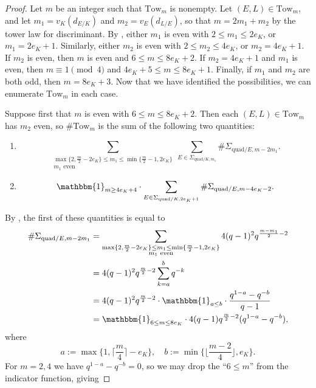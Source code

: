 \documentclass[11pt]{amsart}
\theoremstyle{theorem}
\theoremstyle{example}
\theoremstyle{definition}
\numberwithin{theorem}{section}
\numberwithin{theorem}{section}
\newcommand{\quadr}{\mathrm{quad}}
\newcommand{\Tow}{\mathrm{Tow}}
\begin{document}
\begin{proof}
    Let $m$ be an integer such that $\Tow_m$ is nonempty. Let $(E,L) \in \Tow_m$, and let $m_1 = v_K(d_{E/K})$ and $m_2 = v_E(d_{L/E})$, so that $m = 2m_1 + m_2$ by the tower law for discriminant. By \cite[Lemma~4.3]{tunnell}, either $m_1$ is even with $2 \leq m_1 \leq 2e_K$, or $m_1 = 2e_K + 1$. Similarly, either $m_2$ is even with $2 \leq m_2 \leq 4e_K$, or $m_2 = 4e_K + 1$. If $m_2$ is even, then $m$ is even and $6 \leq m \leq 8e_K + 2$. If $m_2 = 4e_K + 1$ and $m_1$ is even, then $m \equiv 1\pmod{4}$ and $4e_K + 5 \leq m \leq 8e_K + 1$. Finally, if $m_1$ and $m_2$ are both odd, then $m = 8e_K + 3$. Now that we have identified the possibilities, we can enumerate $\Tow_m$ in each case.
    
    Suppose first that $m$ is even with $6 \leq m \leq 8e_K + 2$. Then each $(E,L) \in \Tow_m$ has $m_2$ even, so $\#\Tow_m$ is the sum of the following two quantities:
    \begin{enumerate}
    \item $$\sum_{\substack{\max\{2, \frac{m}{2} - 2e_K\} \leq m_1 \leq \min\{\frac{m}{2} - 1, 2e_K\} \\ \text{$m_1$ even}}} \sum_{E \in \Sigma_{\quadr/K,m_1}} \#\Sigma_{\quadr/E, m - 2m_1}.$$
    \item $$\mathbbm{1}_{m \geq 4e_K + 4}\cdot \sum_{E \in \Sigma_{\quadr/K,2e_K + 1}} \#\Sigma_{\quadr/E,m - 4e_K - 2}.
    $$
    \end{enumerate}
    By \cite[Lemma~4.3]{tunnell}, the first of these quantities is equal to 
    \begin{align*}
        \#\Sigma_{\quadr/E, m - 2m_1} 
        &= \sum_{\substack{\max\{2, \frac{m}{2} - 2e_K\} \leq m_1 \leq \min\{\frac{m}{2} - 1, 2e_K\} \\ \text{$m_1$ even}}} 4(q-1)^2 q^{\frac{m-m_1}{2} - 2}
        \\
        &= 4(q-1)^2q^{\frac{m}{2} - 2}\sum_{k=a}^b q^{-k}
        \\
        &= 4(q-1)^2q^{\frac{m}{2} - 2} \cdot \mathbbm{1}_{a \leq b}\cdot \frac{q^{1-a} - q^{-b}}{q-1}
        \\
        &= \mathbbm{1}_{6 \leq m \leq 8e_K} \cdot 4(q-1)q^{\frac{m}{2} - 2}(q^{1-a} - q^{-b}),
        \end{align*}
        where 
        $$
        a := \max\{1, \lceil\frac{m}{4}\rceil - e_K\}, \quad b := \min\{\lfloor \frac{m-2}{4}\rfloor, e_K\}. 
        $$
    For $m = 2,4$ we have $q^{1-a} - q^{-b} = 0$, so we may drop the ``$6 \leq m$'' from the indicator function, giving 

\end{proof}
\end{document}
